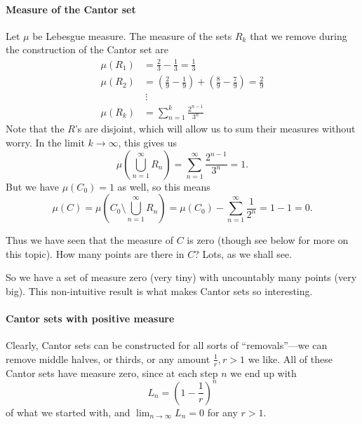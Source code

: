 \documentclass{article}
\begin{document}
\paragraph{Measure of the Cantor set}
Let $\mu$ be Lebesgue measure.  The measure of the sets $R_k$ that we remove during the construction of the Cantor set are
\begin{align}
\mu(R_1) &= \frac{2}{3} - \frac{1}{3} = \frac{1}{3}\\
\mu(R_2) &= \left(\frac{2}{9} - \frac{1}{9}\right) + \left(\frac{8}{9} - \frac{7}{9}\right) = \frac{2}{9}\\
&\ \vdots\\
\mu(R_k) &= \sum_{n=1}^{k}\frac{2^{n-1}}{3^n}
\end{align}
Note that the $R$'s are disjoint, which will allow us to sum their measures without worry.  In the limit $k \to \infty$, this gives us
\begin{equation}
\mu\left(\bigcup_{n=1}^{\infty}R_n\right) = \sum_{n=1}^{\infty} \frac{2^{n-1}}{3^n} = 1.
\end{equation}
But we have $\mu(C_0) = 1$ as well, so this means
\begin{equation}
\mu(C) = \mu\left(C_0 \setminus \bigcup_{n=1}^{\infty}R_n\right) = \mu(C_0) - \sum_{n=1}^{\infty} \frac{1}{2^n} = 1-1 = 0.
\end{equation}

Thus we have seen that the measure of $C$ is zero (though see below for more on this topic).  How many points are there in $C$?  
Lots, as we shall see.


So we have a set of measure zero (very tiny) with uncountably many points (very big).  This non-intuitive result is what 
makes Cantor sets so interesting.

\paragraph{Cantor sets with positive measure}
Clearly, Cantor sets can be constructed for all sorts of ``removals''---we can remove middle halves, or thirds, or any amount 
$\frac{1}{r}, r>1$ we like.  All of these Cantor sets have measure zero, since at each step $n$ we end up with
\begin{equation}
L_n = \left(1 - \frac{1}{r}\right)^n
\end{equation}
of what we started with, and $\lim_{n \to \infty} L_n = 0$ for any $r>1$.
\end{document}
